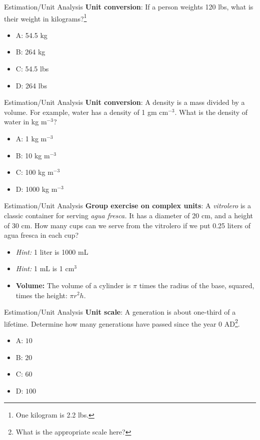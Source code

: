 \documentclass{beamer}
\begin{document}
\begin{frame}{Estimation/Unit Analysis}
\textbf{Unit conversion}: If a person weights 120 lbs, what is their weight in kilograms?\footnote{One kilogram is 2.2 lbs.}
\begin{itemize}
\item A: 54.5 kg
\item B: 264 kg
\item C: 54.5 lbs
\item D: 264 lbs
\end{itemize}
\end{frame}

\begin{frame}{Estimation/Unit Analysis}
\textbf{Unit conversion}: A \alert{density} is a mass divided by a volume.  For example, water has a density of 1 gm cm$^{-3}$.  What is the density of water in kg m$^{-3}$?
\begin{itemize}
\item A: 1 kg m$^{-3}$
\item B: 10 kg m$^{-3}$
\item C: 100 kg m$^{-3}$
\item D: 1000 kg m$^{-3}$
\end{itemize}
\end{frame}

\begin{frame}{Estimation/Unit Analysis}
\textbf{Group exercise on complex units}: A \textit{vitrolero} is a classic container for serving \textit{agua fresca.}  It has a diameter of 20 cm, and a height of 30 cm.  How many cups can we serve from the vitrolero if we put 0.25 liters of agua fresca in each cup?
\begin{itemize}
\item \textit{Hint:} 1 liter is 1000 mL
\item \textit{Hint:} 1 mL is 1 cm$^3$
\item \textbf{Volume:} The volume of a cylinder is $\pi$ times the radius of the base, squared, times the height: $\pi r^2 h$.
\end{itemize}
\end{frame}

\begin{frame}{Estimation/Unit Analysis}
\textbf{Unit scale}: A generation is about one-third of a lifetime. Determine how many generations have passed since the year 0 AD\footnote{What is the appropriate scale here?}.
\begin{itemize}
\item A: $10$
\item B: $20$
\item C: $60$
\item D: $100$
\end{itemize}
\end{frame}
\end{document}
